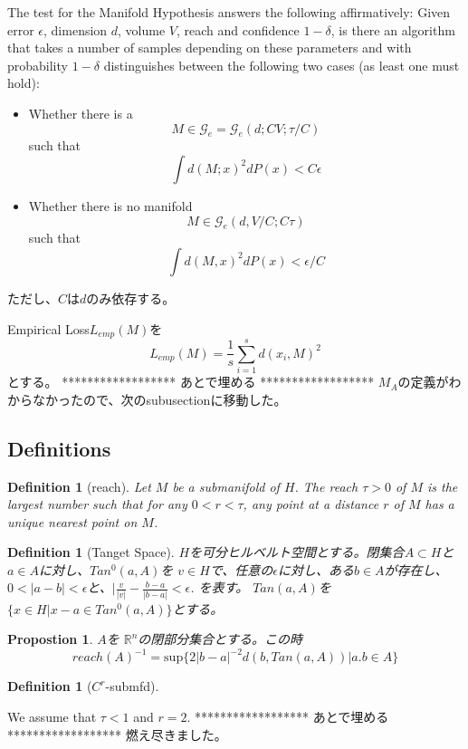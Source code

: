 \documentclass{jarticle}
\newtheorem{dfn}[thm]{Definition}
\newtheorem{prop}[thm]{Propostion}
\begin{document}
The test for the Manifold Hypothesis answers the following affirmatively: Given error $\epsilon$, dimension $d$,
volume $V$, reach and confidence $1 - \delta$, is there an algorithm that takes a number of samples depending on
these parameters and with probability $1 - \delta$ distinguishes between the following two cases (as least one must
hold):
\begin{itemize}
  \item Whether there is a
  \begin{equation*}
    M \in \mathcal{G}_e = \mathcal{G}_e(d;CV;\tau/C)
  \end{equation*}
  such that
  \begin{equation*}
    \int d(M; x)^2 dP(x) < C \epsilon
  \end{equation*}
  \item Whether there is no manifold
  \begin{equation*}
    M \in \mathcal{G}_e(d, V/C; C\tau)
  \end{equation*}
  such that
  \begin{equation*}
    \int d(M,x)^2dP(x) < \epsilon/C
  \end{equation*}
\end{itemize}
ただし、$C$は$d$のみ依存する。

Empirical Loss$L_{emp}(M)$を
\begin{equation*}
 L_{emp}(M)= \frac{1}{s}\sum_{i=1}^s d(x_i,M)^2
\end{equation*}
とする。
******************
 あとで埋める
 ******************
$M_A$の定義がわからなかったので、次のsubusectionに移動した。

\subsection{Definitions}
\label{sub-Definitions}
\begin{dfn}[reach]
  Let $M$ be a submanifold of $H$. The reach $ \tau > 0$ of $M$ is the largest number such that
  for any $0 < r < \tau$, any point at a distance $r$ of $M$ has a unique nearest point on $M$.
\end{dfn}

\begin{dfn}[Tanget Space]
$H$を可分ヒルベルト空間とする。閉集合$A \subset H$と$a \in A$に対し、$Tan^0(a,A)$を
$v \in H$で、任意の$\epsilon$に対し、ある$b \in A$が存在し、$0 <|a -b| < \epsilon$と、$|\frac{v}{|v|} - \frac{b-a}{|b-a|} < \epsilon$.
を表す。
$Tan(a,A)$を$\{x \in H| x -a \in Tan^0(a,A)\}$とする。
\end{dfn}
\begin{prop} $A$を $\mathbb{R}^n$の閉部分集合とする。この時
  \begin{equation*}
   reach(A)^{-1}=\mathrm{sup}\{2|b-a|^{-2}d(b,Tan(a,A)) | a.b \in A\}
  \end{equation*}
\end{prop}
\begin{dfn}[$C^r$-submfd]

\end{dfn}
We assume that $\tau < 1$ and $r = 2$.
******************
 あとで埋める
******************
燃え尽きました。
\end{document}
